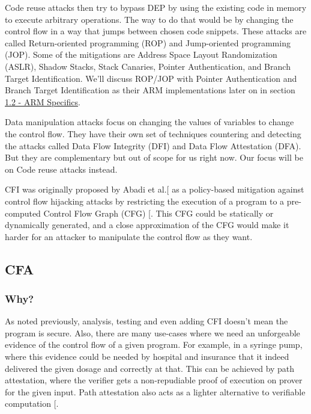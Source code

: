 \documentclass[a4paper, nobind]{templates/ociamthesis}
\begin{document}
Code reuse attacks then try to bypass DEP by using the existing code in memory to
execute arbitrary operations. The way to do that would be by changing the control
flow in a way that jumps between chosen code snippets. These attacks are called
Return-oriented programming (ROP) and Jump-oriented programming (JOP).
Some of the mitigations are Address Space Layout Randomization (ASLR),
Shadow Stacks, Stack Canaries, Pointer Authentication, and Branch Target Identification.
We'll discuss ROP/JOP with Pointer Authentication and Branch Target
Identification as their ARM implementations later on in section \hyperref[arm-specifics]{1.2 - ARM Specifics}.

Data manipulation attacks focus on changing the values of variables to change the control flow.
They have their own set of techniques countering and detecting the attacks called
Data Flow Integrity (DFI) and Data Flow Attestation (DFA). But they are complementary
but out of scope for us right now. Our focus will be on Code reuse attacks instead.

CFI was originally proposed by Abadi et al.{[}\citeproc{ref-abadi2009control}{1}{]} as a policy-based mitigation
against control flow hijacking attacks by restricting the execution of a program
to a pre-computed Control Flow Graph (CFG) {[}\citeproc{ref-sok}{5}{]}. This CFG could be statically or
dynamically generated, and a close approximation of the CFG would make it harder
for an attacker to manipulate the control flow as they want.

\subsection{CFA}\label{cfa}

\subsubsection{Why?}\label{why}

As noted previously, analysis, testing and even adding CFI doesn't mean the program is secure.
Also, there are many use-cases where we need an unforgeable evidence of the control flow
of a given program. For example, in a syringe pump, where this evidence could be
needed by hospital and insurance that it indeed delivered the given dosage and correctly at that.
This can be achieved by path attestation, where the verifier gets a non-repudiable
proof of execution on prover for the given input.
Path attestation also acts as a lighter alternative to verifiable computation {[}\citeproc{ref-walfish2015verifying}{54}{]}.
\end{document}
